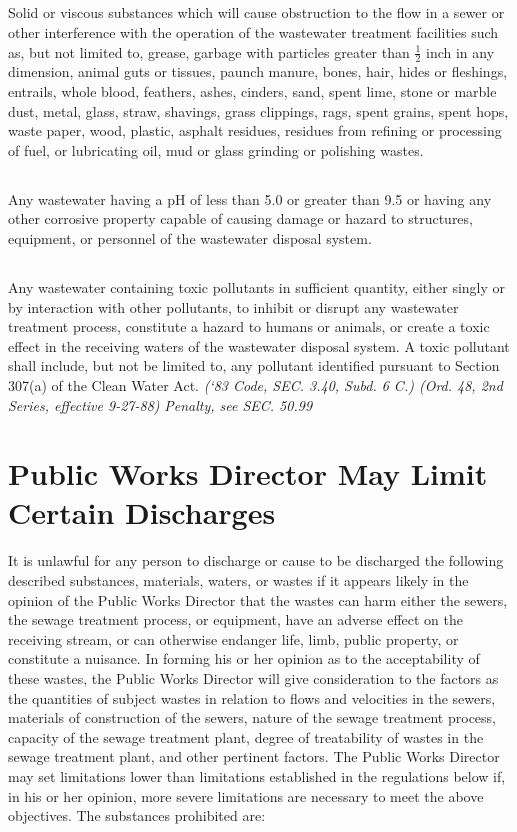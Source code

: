 \documentclass[code.tex]{subfiles}
\begin{document}
\subsection{}
Solid or viscous substances which will cause obstruction to the flow in a sewer or other interference with the operation of the wastewater treatment facilities such as, but not limited to, grease, garbage with particles greater than $\frac{1}{2}$ inch in any dimension, animal guts or tissues, paunch manure, bones, hair, hides or fleshings, entrails, whole blood, feathers, ashes, cinders, sand, spent lime, stone or marble dust, metal, glass, straw, shavings, grass clippings, rags, spent grains, spent hops, waste paper, wood, plastic, asphalt residues, residues from refining or processing of fuel, or lubricating oil, mud or glass grinding or polishing wastes.
\subsection{}
Any wastewater having a pH of less than 5.0 or greater than 9.5 or having any other corrosive property capable of causing damage or hazard to structures, equipment, or personnel of the wastewater disposal system.
\subsection{}
Any wastewater containing toxic pollutants in sufficient quantity, either singly or by interaction with other pollutants, to inhibit or disrupt any wastewater treatment process, constitute a hazard to humans or animals, or create a toxic effect in the receiving waters of the wastewater disposal system.  A toxic pollutant shall include, but not be limited to, any pollutant identified pursuant to Section 307(a) of the Clean Water Act.\newline
\emph{(‘83 Code, SEC. 3.40, Subd. 6 C.) (Ord. 48, 2nd Series, effective 9-27-88)}\newline
\emph{Penalty, see SEC. 50.99}
\section{Public Works Director May Limit Certain Discharges}
It is unlawful for any person to discharge or cause to be discharged the following described substances, materials, waters, or wastes if it appears likely in the opinion of the Public Works Director that the wastes can harm either the sewers, the sewage treatment process, or equipment, have an adverse effect on the receiving stream, or can otherwise endanger life, limb, public property, or constitute a nuisance. In forming his or her opinion as to the acceptability of these wastes, the Public Works Director will give consideration to the factors as the quantities of subject wastes in relation to flows and velocities in the sewers, materials of construction of the sewers, nature of the sewage treatment process, capacity of the sewage treatment plant, degree of treatability of wastes in the sewage treatment plant, and other pertinent factors. The Public Works Director may set limitations lower than limitations established in the regulations below if, in his or her opinion, more severe limitations are necessary to meet the above objectives. The substances prohibited are:
\end{document}
